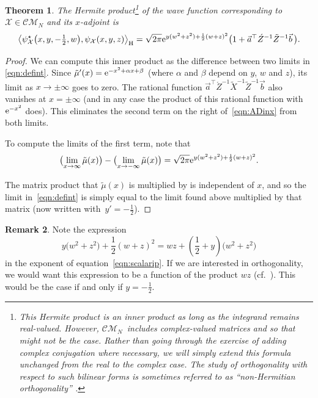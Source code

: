 \documentclass[pdftex]{sigma}
\numberwithin{equation}{section}
\newtheorem{Theorem}{Theorem}[section]
\theoremstyle{definition}
\newtheorem{Remark}[Theorem]{Remark}
\def\psistar{\psi^{\star}}
\def\X{\mathcal{X}}
\def\CM{\mathcal{C\!M}}
\begin{document}
\begin{Theorem}\label{thm:scalarip} The Hermite product\footnote{This
 Hermite product is an inner product as long as the integrand remains
 real-valued. However, $\CM_N$~includes complex-valued matrices
 and so that might not be the case. Rather than going through the
 exercise of adding complex conjugation where necessary, we will
 simply extend this formula unchanged from the real to the complex
 case.
 The study of orthogonality with respect to such bilinear forms is
 sometimes referred to as ``non-Hermitian
 orthogonality'' \cite{BarYat}.}
 of the wave
 function corresponding to $\X\in\CM_N$ and
 its $x$-adjoint is
\begin{equation} \label{eqn:scalarip}\bigl\langle
\relax{\psistar_{\X}\bigl(x,y,-\tfrac{1}{2},w\bigr)},\psi_{\X}(x,y,z)\bigr\rangle_{\rm H}=
 \sqrt{2\pi } {\rm e}^{y
 (w^2+z^2)+\frac{
 1}{2} (w+z)^2}
 \bigl(1+\vec a^{\top}\acute Z^{-1}\tilde Z^{-1}\vec b\,\bigr).
\end{equation}
\end{Theorem}
\begin{proof}
We can compute this inner product as the difference between two limits
in \eqref{eqn:defint}.
Since $\tilde\mu'(x)={\rm e}^{-x^2+\alpha x+\beta}$ (where $\alpha$ and
$\beta$ depend on $y$, $w$ and $z$), its limit as $x\to\pm\infty$
goes to zero. The rational function $\vec a^{\top}\acute
Z^{-1}\tilde X^{-1}\tilde Z^{-1}\vec b$ also vanishes at $x=\pm\infty$
(and in any case the product of this rational function with ${\rm e}^{-x^2}$
does). This eliminates the second term on the right of~\eqref{eqn:ADinx} from both limits.

To compute the limits of the first term, note that
\[
\bigl(\lim_{x\to\infty}\tilde\mu(x)\bigr)-
\bigl(\lim_{x\to-\infty}\tilde\mu(x)\bigr)=
 \sqrt{{2\pi} } {\rm e}^{y
 (w^2+z^2)+\frac{
 1}{2} (w+z)^2}.
 \]

The matrix product that $\tilde\mu(x)$ is multiplied by is independent of $x$,
and so the limit in~\eqref{eqn:defint} is simply equal to the limit
found above multiplied by that matrix (now written with~${y'=-\frac{1}{2}}$).
\end{proof}

\begin{Remark}\label{rem:yval}
 Note the expression \[y
 \bigl(w^2+z^2\bigr)+\frac{
 1}{2} (w+z)^2=wz+\left(\frac12+y\right)\bigl(w^2+z^2\bigr)
\] in the exponent of equation~\eqref{eqn:scalarip}. If we are
interested in orthogonality, we would want this expression to be a
function of the product $wz$ (cf.~\cite{twofacts}). This would be the case if and only if
$y=-\frac{1}{2}$.
\end{Remark}
\end{document}

